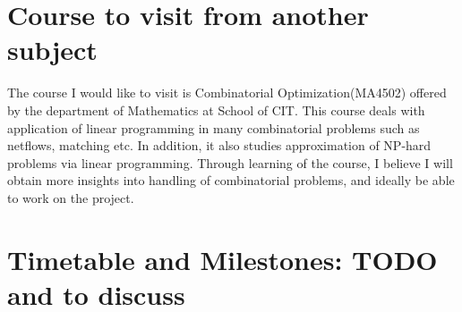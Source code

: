 \documentclass[12pt,letterpaper]{article}
\begin{document}
\section{Course to visit from another subject}
The course I would like to visit is Combinatorial Optimization(MA4502) offered by the department of Mathematics at School of CIT.
This course deals with application of linear programming in many combinatorial problems such as netflows, matching etc. 
In addition, it also studies approximation of NP-hard problems via linear programming. Through learning of the course, 
I believe I will obtain more insights into handling of combinatorial problems, and ideally be able to work on the project. 

\section{Timetable and Milestones: TODO and to discuss}



\end{document}
